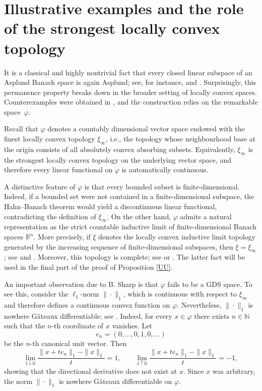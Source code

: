 \documentclass[12pt]{amsart}
\theoremstyle{plain}
\theoremstyle{definition}
\theoremstyle{remark}
\begin{document}
\section{Illustrative examples and the role of the strongest locally convex topology}
It is a classical and highly nontrivial fact that every closed linear subspace of an Asplund Banach space is again Asplund; see, for instance, \cite{p} and \cite[Proposition~2.33]{np}. Surprisingly, this permanence property breaks down in the broader setting of locally convex spaces. Counterexamples were obtained in \cite{Kakol-Leiderman}, and the construction relies on the remarkable space~$\varphi$.

Recall that $\varphi$ denotes a countably dimensional vector space endowed with the finest locally convex topology $\xi_\infty$, i.e., the topology whose neighbourhood base at the origin consists of all absolutely convex absorbing subsets. Equivalently, $\xi_\infty$ is the strongest locally convex topology on the underlying vector space, and therefore every linear functional on $\varphi$ is automatically continuous.

A distinctive feature of $\varphi$ is that every bounded subset is finite-dimensional. Indeed, if a bounded set were not contained in a finite-dimensional subspace, the Hahn--Banach theorem would yield a discontinuous linear functional, contradicting the definition of $\xi_\infty$. On the other hand, $\varphi$ admits a natural representation as the strict countable inductive limit of finite-dimensional Banach spaces $\mathbb{R}^n$. More precisely, if $\xi$ denotes the locally convex inductive limit topology generated by the increasing sequence of finite-dimensional subspaces, then $\xi=\xi_\infty$; see \cite[Chapter~2.4]{KKPS} and \cite[0.3.1]{Bonet}. Moreover, this topology is complete; see \cite[Proposition~8.4.16(iv)]{Bonet} or \cite{Zelazko}. The latter fact will be  used in the final part of the proof of Proposition \ref{UU}.

An important observation due to B. Sharp \cite{s} is that $\varphi$ fails to be a GDS space. To see this, consider the $\ell_1$-norm $\|\cdot\|_1$, which is continuous with respect to $\xi_\infty$ and therefore defines a continuous convex function on $\varphi$. Nevertheless, $\|\cdot\|_1$ is nowhere G\^ateaux differentiable; see \cite[Example~1.4(b)]{p}. Indeed, for every $x\in\varphi$ there exists $n\in\mathbb N$ such that the $n$-th coordinate of $x$ vanishes. Let
\[
e_n=(0,\ldots,0,1,0,\ldots)
\]
be the $n$-th canonical unit vector. Then
\[
\lim_{t\downarrow0}
\frac{\|x+te_n\|_1-\|x\|_1}{t}=1,
\qquad
\lim_{t\uparrow0}
\frac{\|x+te_n\|_1-\|x\|_1}{t}=-1,
\]
showing that the directional derivative does not exist at $x$. Since $x$ was arbitrary, the norm $\|\cdot\|_1$ is nowhere G\^ateaux differentiable on $\varphi$.
\end{document}
